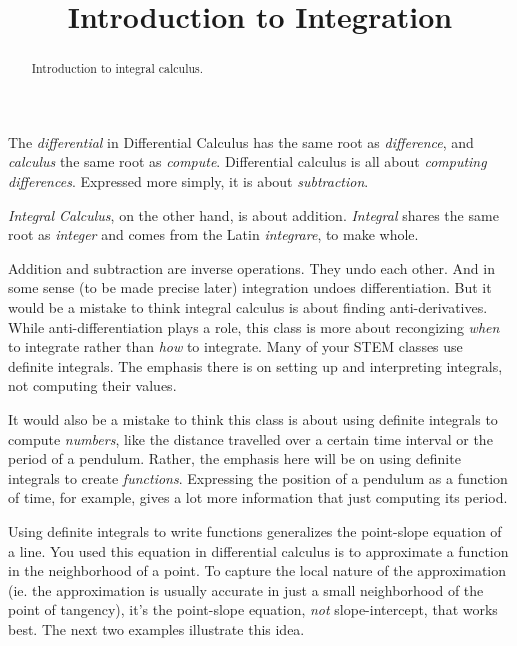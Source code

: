 \documentclass{ximera}
\title{Introduction to Integration}
\begin{document}
\begin{abstract}
Introduction to integral calculus.
\end{abstract}
\maketitle

The \emph{differential} in Differential Calculus has the same root as \emph{difference}, and \emph{calculus} the same root as \emph{compute}. Differential calculus is all about \emph{computing differences}. Expressed more simply, it is about \emph{subtraction}.

\emph{Integral Calculus}, on the other hand, is about addition. \emph{Integral} shares the same root as \emph{integer} and comes from the Latin \emph{integrare}, to make whole. 

Addition and subtraction are inverse operations. They undo each other. And in some sense (to be made precise later) integration
undoes differentiation. But it would be a mistake to think integral calculus is about finding anti-derivatives. While anti-differentiation plays a role, this class is more about recongizing \emph{when} to integrate rather than \emph{how} to integrate. Many of your STEM classes use definite integrals. The emphasis there is on setting up and interpreting integrals, not computing their values. 

It would also be a mistake to think this class is about using definite integrals to compute \emph{numbers}, like the distance travelled over a certain time interval or the period of a pendulum. Rather, the emphasis here will be on using definite integrals to create \emph{functions}. Expressing the position of a pendulum as a function of time, for example, gives a lot more information that just computing its period. 

Using definite integrals to write functions generalizes the point-slope equation of a line. You used this equation in differential calculus is to approximate a function in the neighborhood of a point. To capture the local nature of the approximation (ie. the approximation is usually accurate in just a small neighborhood of the point of tangency), it's the point-slope equation, \emph{not} slope-intercept, that works best. The next two examples illustrate this idea.   %
\end{document}
